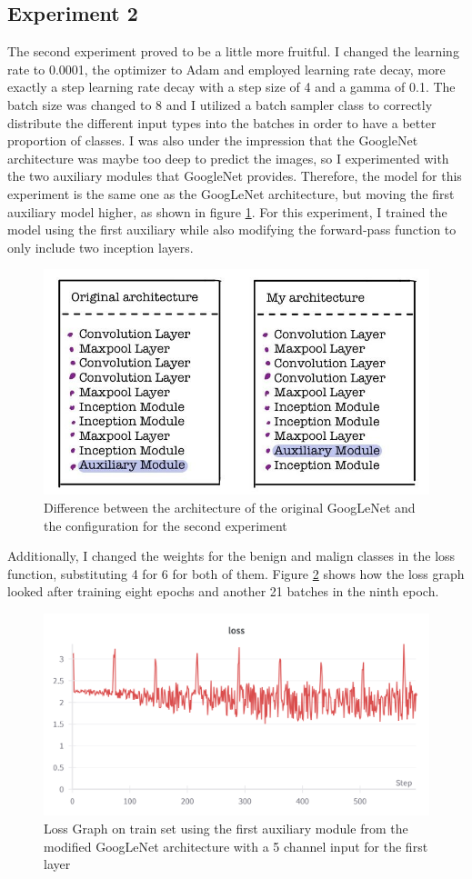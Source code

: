 \subsection{Experiment 2}

The second experiment proved to be a little more fruitful. I changed the learning rate to 0.0001, the optimizer to Adam and employed learning rate decay, more exactly a step learning rate decay with a step size of 4 and a gamma of 0.1. The batch size was changed to 8 and I utilized a batch sampler class to correctly distribute the different input types into the batches in order to have a better proportion of classes. I was also under the impression that the GoogleNet architecture was maybe too deep to predict the images, so I experimented with the two auxiliary modules that GoogleNet provides. Therefore, the model for this experiment is the same one as the GoogLeNet architecture, but moving the first auxiliary model higher, as shown in figure \ref{fig:fig41}. For this experiment, I trained the model using the first auxiliary while also modifying the forward-pass function to only include two inception layers.

\begin{figure}
    \centering
    \includegraphics[width=0.5\linewidth]{figures/Figure53.png}
    \caption{Difference between the architecture of the original GoogLeNet and the configuration for the second experiment}
    \label{fig:fig41}
\end{figure}

Additionally, I changed the weights for the benign and malign classes in the loss function, substituting 4 for 6 for both of them. Figure \ref{fig:fig10} shows how the loss graph looked after training eight epochs and another 21 batches in the ninth epoch.

\begin{figure}[!ht]
    \centering
    \includegraphics[width=1\textwidth]{figures/Figure11.png}
    \caption{Loss Graph on train set using the first auxiliary module from the modified GoogLeNet architecture with a 5 channel input for the first layer}
    \label{fig:fig10}
\end{figure}

